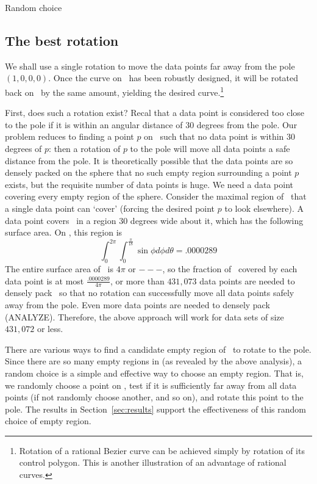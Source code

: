 Random choice

\subsection{The best rotation}
\label{sec:best}

We shall use a single rotation to move the data points far away from the 
pole $(1,0,0,0)$.
Once the curve on \ has been robustly designed, it will be rotated 
back on \ by the same amount, 
yielding the desired curve.\footnote{Rotation of a rational 
	Bezier curve can be achieved simply by
	rotation of its control polygon.
	This is another illustration of an advantage of rational curves.}

First, does such a rotation exist?
Recal that a data point is considered too close to the pole if it is
within an angular distance of 30 degrees from the pole.
Our problem reduces to finding a point $p$ on \ such that no data
point is within 30 degrees of $p$:
then a rotation of $p$ to the pole will move all data points a safe
distance from the pole.
It is theoretically possible that the data points are so densely packed
on the sphere that no such empty region surrounding a point $p$ exists,
but the requisite number of data points is huge.
We need a data point covering every empty region of the sphere.
Consider the maximal region of \ that a single data point can
`cover' (forcing the desired point $p$ to look elsewhere).
A data point covers \ in a region 30 degrees wide about it,
which has the following surface area.
On , this region is 
\[
  \int_0^{2\pi} \int_0^{\frac{\pi}{18}}  \sin \phi d\phi d\theta
  = .0000289
\]
The entire surface area of \ is $4\pi$ or $---$,
so the fraction of \ covered by each data point is at most
$\frac{.0000289}{4\pi}$,
or more than $431,073$ data points are needed to densely pack \
so that no rotation can successfully move all data points safely away
from the pole.
Even more data points are needed to densely pack  (ANALYZE).
Therefore, the above approach will work for data sets of size 
$431,072$ or less.

There are various ways to find a candidate empty region of \
to rotate to the pole.
Since there are so many empty regions in \Sn{3} (as revealed by the
above analysis), a random choice is a simple and effective way to 
choose an empty region.
That is, we randomly choose a point on \Sn{3}, test if it is
sufficiently far away from all data points (if not randomly choose
another, and so on), and rotate this point to the pole.
The results in Section~\ref{sec:results} support the effectiveness
of this random choice of empty region.

